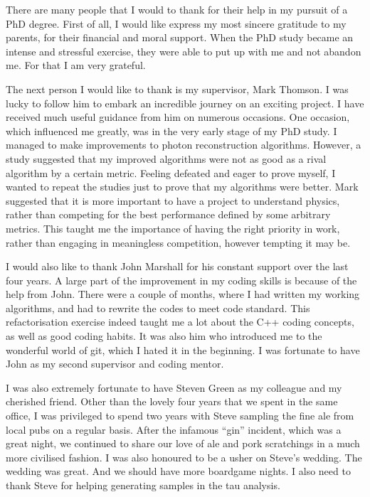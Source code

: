 \begin{acknowledgements}
There are many people that I would to thank  for their help in my pursuit of a PhD degree. First of all, I would like express my most sincere gratitude to my parents, for their financial and moral support. When the PhD study became an intense and stressful exercise, they were able to put up with me and not abandon me. For that I am very grateful.



The next person I would like to thank is my supervisor, Mark Thomson. I was lucky to follow him to embark an incredible journey on an exciting project. I have received much useful guidance from him on numerous occasions. One occasion, which influenced me greatly, was in the very early stage of my PhD study. I managed to make improvements to photon reconstruction algorithms. However, a study suggested that my improved algorithms were not as good as a rival algorithm by a certain metric. Feeling defeated and eager to prove myself, I wanted to repeat the studies just to prove that my algorithms were better. Mark suggested that it is more important to have a project to understand physics, rather than competing for the best performance defined by some arbitrary metrics. This taught me the importance of having the right priority in work, rather than engaging in meaningless competition, however tempting it may be.

I would also like to thank John Marshall for his constant support over the last four years. A large part of the improvement in my coding skills is because of the help from John. There were a couple of months, where I had written my working algorithms, and had to rewrite the codes to meet \pandora code standard. This refactorisation exercise indeed taught me a lot about the C++ coding concepts, as well as good coding habits. It was also him who introduced me to the wonderful world of git, which I hated it in the beginning. I was fortunate to have John as my second supervisor and coding mentor.

I was also extremely fortunate to have Steven Green as my colleague and my cherished friend. Other than the lovely four years that we spent in the same office,   I was privileged to spend two years with Steve sampling the fine ale from local pubs on a regular basis. After the infamous ``gin'' incident, which was a great night, we continued to share our love of ale and pork scratchings in a much more civilised fashion. I was also honoured to be a usher on Steve's wedding. The wedding was great. And we should have more boardgame nights. I also need to thank Steve for helping generating samples in the tau analysis.


\end{acknowledgements}
